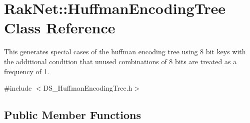 \hypertarget{class_rak_net_1_1_huffman_encoding_tree}{\section{Rak\-Net\-:\-:Huffman\-Encoding\-Tree Class Reference}
\label{class_rak_net_1_1_huffman_encoding_tree}
}


This generates special cases of the huffman encoding tree using 8 bit keys with the additional condition that unused combinations of 8 bits are treated as a frequency of 1.  




{\ttfamily \#include $<$D\-S\-\_\-\-Huffman\-Encoding\-Tree.\-h$>$}

\subsection*{Public Member Functions}

